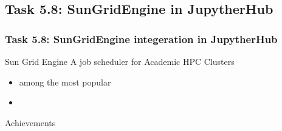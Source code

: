 \documentclass{beamer}
\begin{document}
\subsection{Task 5.8: SunGridEngine in JupytherHub}
\begin{frame}
  \frametitle{Task 5.8: SunGridEngine integeration in JupytherHub}

  \begin{block} {Sun Grid Engine}
    A job scheduler for Academic HPC Clusters
    \begin{itemize}
    \item among the most popular
    \item 
    \end{itemize}
  \end{block}

  \begin{block}{Achievements}
  \end{block}
\end{frame}

\end{document}
